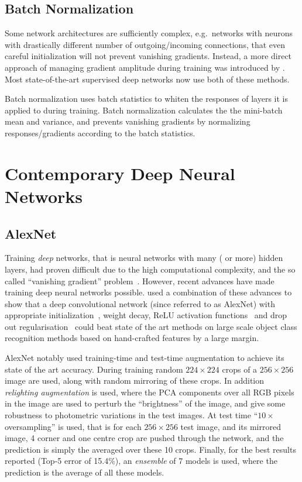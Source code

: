 \documentclass[thesis]{subfiles}
\begin{document}
\subsection{Batch Normalization}
Some network architectures are sufficiently complex, e.g.~networks with neurons with drastically different number of outgoing/incoming connections, that even careful initialization will not prevent vanishing gradients. Instead, a more direct approach of managing gradient amplitude during training was introduced by \citet{Ioffe2015}. Most state-of-the-art supervised deep networks now use both of these methods.

Batch normalization uses batch statistics to whiten the responses of layers it is applied to during training. Batch normalization calculates the the mini-batch mean and variance, and prevents vanishing gradients by normalizing responses/gradients according to the batch statistics. 

\section{Contemporary Deep Neural Networks}

\subsection{AlexNet}
Training \emph{deep} networks, that is neural networks with many ( or more) hidden layers, had proven difficult due to the high computational complexity, and the so called ``vanishing gradient'' problem~\citep{bengio:ieeenn94}. However, recent advances have made training deep neural networks possible. \citet{Krizhevsky2012} used a combination of these advances to show that a deep convolutional network (since referred to as AlexNet) with appropriate initialization~\citep{Sutskever2013momentum}, weight decay, ReLU activation functions~\citep{conf/icml/NairH10} and drop out regularisation~\citep{Hinton2012} could beat state of the art methods on large scale object class recognition methods based on hand-crafted features by a large margin. 

AlexNet notably used training-time and test-time augmentation to achieve its state of the art accuracy. During training random $224 \times 224$ crops of a $256 \times 256$ image are used, along with random mirroring of these crops. In addition \emph{relighting augmentation} is used, where the PCA components over all RGB pixels in the image are used to perturb the ``brightness'' of the image, and give some robustness to photometric variations in the test images. At test time ``$10\times$ oversampling'' is used, that is for each $256\times 256$ test image, and its mirrored image, 4 corner and one centre crop are pushed through the network, and the prediction is simply the averaged over these 10 crops. Finally, for the best results reported (Top-5 error of 15.4\%), an \emph{ensemble} of 7 models is used, where the prediction is the average of all these models. 
\end{document}
